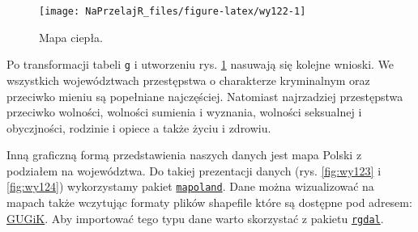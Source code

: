 \documentclass[polish,]{book}
\begin{document}
\begin{figure}[h]

{\centering \texttt{[image: NaPrzelajR\_files/figure-latex/wy122-1]} 

}

\caption{Mapa ciepła.}\label{fig:wy122}
\end{figure}

Po transformacji tabeli \texttt{g} i utworzeniu rys. \ref{fig:wy122} nasuwają się kolejne wnioski. We
wszystkich województwach przestępstwa o charakterze kryminalnym oraz przeciwko mieniu są popełniane najczęściej. Natomiast najrzadziej przestępstwa przeciwko
wolności, wolności sumienia i wyznania, wolności seksualnej i obyczjności, rodzinie i opiece a także życiu i zdrowiu.

Inną graficzną formą przedstawienia naszych danych jest mapa Polski z podziałem na województwa. Do takiej prezentacji danych (rys. \ref{fig:wy123} i \ref{fig:wy124}) wykorzystamy pakiet \href{https://rdrr.io/rforge/mapoland/}{\texttt{mapoland}}. Dane można wizualizować na mapach także wczytując formaty plików shapefile które są dostępne pod adresem: \href{http://www.gugik.gov.pl/pzgik/dane-bez-oplat/dane-z-panstwowego-rejestru-granic-i-powierzchni-jednostek-podzialow-terytorialnych-kraju-prg}{GUGiK}. Aby importować tego typu dane warto skorzystać z pakietu \href{https://rdrr.io/cran/rgdal/}{\texttt{rgdal}}.
\end{document}
